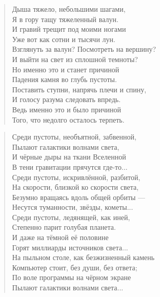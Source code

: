 \documentclass[12pt, a4paper]{article}
\begin{document}
\ttfamily

\begin{verse}
    Дыша тяжело, небольшими шагами,\\
    Я в гору тащу тяжеленный валун.\\
    И гравий трещит под моими ногами\\
    Уже вот как сотни и тысячи лун.\\[4mm]
     
    Взглянуть за валун? Посмотреть на вершину?\\
    И выйти на свет из сплошной темноты?\\
    Но именно это и станет причиной\\
    Падения камня во глубь пустоты.\\[4mm]

    Поставить ступни, напрячь плечи и спину,\\
    И голосу разума следовать впредь.\\
    Ведь именно это и было причиной\\
    Того, что недолго осталось терпеть.\\
\end{verse}

\newpage

\begin{verse}
    Среди пустоты, необъятной, забвенной,\\
    Пылают галактики волнами света,\\
    И чёрные дыры на ткани Вселенной\\
    В тени гравитации прячутся где-то...\\[4mm]

    Среди пустоты, искривлённой, разбитой,\\
    На скорости, близкой ко скорости света,\\
    Безумно вращаясь вдоль общей орбиты ---\\
    Несутся туманности, звёзды, кометы...\\[4mm]

    Среди пустоты, ледянящей, как иней,\\
    Степенно парит голубая планета.\\
    И даже на тёмной её половине\\
    Горят миллиарды источников света...\\[4mm]

    На пыльном столе, как безжизненный камень\\
    Компьютер стоит, без души, без ответа;\\
    По воле программы на чёрном экране\\
    Пылают галактики волнами света...\\
\end{verse}
\end{document}
